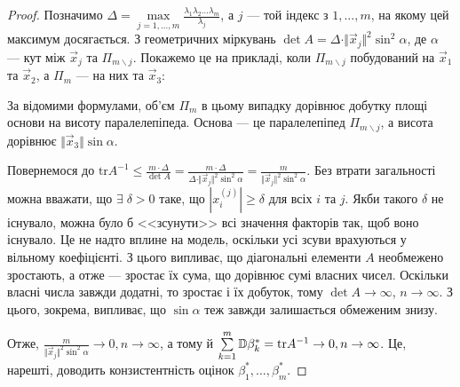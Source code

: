 \begin{proof}
    Позначимо 
    $\Delta = \underset{j=1,...,m}{\max}\frac{\lambda_1 \lambda_2 ... \lambda_m}{\lambda_j}$, а $j$ --- той індекс з $1,...,m$,
    на якому цей максимум досягається. З геометричних міркувань
    $\det A = \Delta \cdot \Vert \vec{x}_j \Vert^2 \sin^2 \alpha$, де $\alpha$ --- кут
    між $\vec{x}_j$ та $\Pi_{m \backslash j}$. Покажемо це на прикладі, коли $\Pi_{m \backslash j}$ побудований
    на $\vec{x}_1$ та $\vec{x}_2$, а $\Pi_m$ --- на них та $\vec{x}_3$:
    \begin{center}
    \end{center}
    За відомими формулами, об'єм $\Pi_m$ в цьому випадку дорівнює добутку площі основи на висоту паралелепіпеда.
    Основа --- це паралелепіпед $\Pi_{m \backslash j}$, а висота дорівнює $\Vert \vec{x}_3 \Vert \sin \alpha$.

    Повернемося до $\mathrm{tr} A^{-1} \leq \frac{m\cdot\Delta}{\det A} = 
    \frac{m\cdot\Delta}{\Delta \cdot \Vert \vec{x}_j \Vert^2 \sin^2 \alpha} = 
    \frac{m}{\Vert \vec{x}_j \Vert^2 \sin^2 \alpha}$.
    Без втрати загальності можна вважати, що $\exists \; \delta > 0$ таке, що 
    $\left|x_i^{(j)}\right| \geq \delta$ для всіх $i$ та $j$. Якби такого $\delta$
    не існувало, можна було б <<зсунути>> всі значення факторів так, щоб воно існувало.
    Це не надто вплине на модель, оскільки усі зсуви врахуються у вільному коефіцієнті.
    З цього випливає, що діагональні елементи $A$ необмежено зростають, а отже --- зростає їх сума, що дорівнює сумі власних чисел.
    Оскільки власні числа завжди додатні, то зростає і їх добуток, тому $\det A \to \infty$, $n\to\infty$.
    З цього, зокрема, випливає, що $\sin\alpha$ теж завжди залишається обмеженим знизу.
   
    Отже, $\frac{m}{\Vert \vec{x}_j \Vert^2 \sin^2 \alpha} \to 0, n\to\infty$, а тому й
    $\sum\limits_{k=1}^m \mathbb{D}\beta_k^* = \mathrm{tr}A^{-1} \to 0, n\to\infty$. Це, нарешті, доводить конзистентність оцінок $\beta_1^*, ..., \beta_m^*$.
\end{proof}

